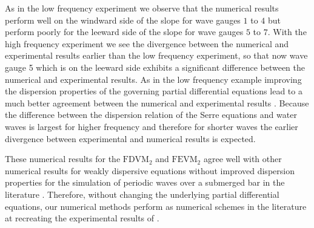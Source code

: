 As in the low frequency experiment we observe that the numerical results perform well on the windward side of the slope for wave gauges $1$ to $4$ but perform poorly for the leeward side of the slope for wave gauges $5$ to $7$. With the high frequency experiment we see the divergence between the numerical and experimental results earlier than the low frequency experiment, so that now wave gauge 5 which is on the leeward side exhibits a significant difference between the numerical and experimental results. As in the low frequency example improving the dispersion properties of the governing partial differential equations lead to a much better agreement between the numerical and experimental results \cite{Beji-Battjes-1994-1,Lannes-2013}. Because the difference between the dispersion relation of the Serre equations and water waves is largest for higher frequency and therefore for shorter waves \citet{Barthelemy-2004-315} the earlier divergence between experimental and numerical results is expected. 

These numerical results for the $\text{FDVM}_2$ and $\text{FEVM}_2$ agree well with other numerical results for weakly dispersive equations without improved dispersion properties for the simulation of periodic waves over a submerged bar in the literature \cite{Beji-Battjes-1994-1,Lannes-2013,Li-2014-169,Zhang-2013-13}. Therefore, without changing the underlying partial differential equations, our numerical methods perform as numerical schemes in the literature at recreating the experimental results of \citet{Beji-Battjes-1994-1}.

